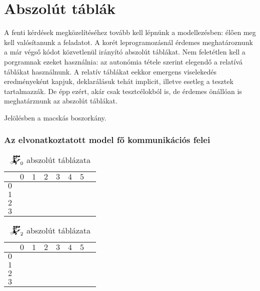 \documentclass{article}
\newcommand{\blk}{\cellcolor{darkgray}}
\newcommand{\red}{\cellcolor{red!33}}
\newcommand{\grn}{\cellcolor{green!33}}
\newcommand{\nothing}{\text{\raisebox{0.4em}{\rotatebox{180}{$\curvearrowleft$}}}}%
\newcommand{\just}[1]{\boxed{#1}}%
\newcommand{\incl}{\mathbf{incl}}
\newcommand{\excl}{\mathbf{excl}}
\newcommand{\currymainfunabs}[1]{\overbat{\mathwitch*_{#1}}}
\begin{document}
	\section{Abszolút táblák}

	A fenti kérdések megközelítéséhez tovább kell lépnünk a modellezésben: élően meg kell valósítanunk a feladatot.
	A korét leprogramozásnál érdemes meghatároznunk a már végső kódot közvetlenül irányító abszolút táblákat.
	Nem feletétlen kell a porgramnak ezeket használnia: az autonómia tétele szerint elegendő a relatívá táblákat használnunk.
	A relatív táblákat eekkor emergens viselekedés eredményeként kapjuk, deklarálásuk tehát implicit, illetve esetleg a tesztek tartalmazzák.
	De épp ezért, akár csak tesztcélokból is, de érdemes önállóan is meghatárznunk az abszolút táblákat.

	Jelölésben a macskás boszorkány.

	\subsubsection{Az elvonatkoztatott model fő kommunikációs felei}

	\begin{table}[H]
		\caption*{$\currymainfunabs0$ abszolút táblázata}
		\centering
		\begin{tabular}{c||c|c|c|c|c|c|c|}
				&	$0$		&	$1$		&	$2$		&	$3$		&	$4$		&	$5$		\\\hline\hline
			$0$	&	\nothing	&	\nothing	&	\nothing	&	\nothing	&	\nothing	&	\grn\just\incl	\\\hline
			$1$	&	\red\just\excl	&	\nothing	&	\nothing	&	\nothing	&	\grn\just\incl	&	\blk		\\\hline
			$2$	&	\blk		&	\red\just\excl	&	\nothing	&	\grn\just\incl	&	\blk		&	\blk		\\\hline
			$3$	&	\blk		&	\blk		&	\blk		&	\blk		&	\blk		&	\blk		\\\hline
		\end{tabular}
	\end{table}

	\begin{table}[H]
		\caption*{$\currymainfunabs2$ abszolút táblázata}
		\centering
		\begin{tabular}{c||c|c|c|c|c|c|c|}
				&	$0$		&	$1$		&	$2$		&	$3$		&	$4$		&	$5$		\\\hline\hline
		$0$	&	\red\just\excl	&	\nothing	&	\nothing	&	\nothing	&	\nothing	&	\grn\just\incl	\\\hline
		$1$	&	\blk		&	\red\just\excl	&	\nothing	&	\nothing	&	\grn\just\incl	&	\blk		\\\hline
		$2$	&	\blk		&	\blk		&	\red\just\excl	&	\grn\just\incl	&	\blk		&	\blk		\\\hline
		$3$	&	\blk		&	\blk		&	\blk		&	\blk		&	\blk		&	\blk		\\\hline
		\end{tabular}
	\end{table}
\end{document}
